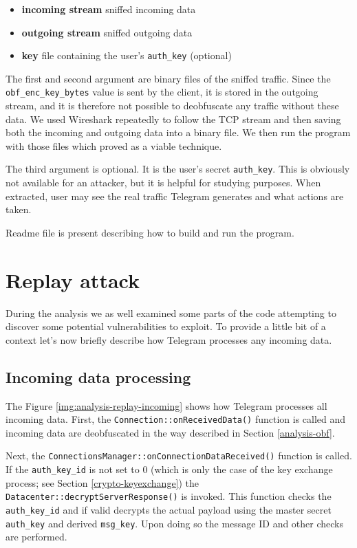 \documentclass[thesis=M,english]{FITthesis}[2012/10/20]
\begin{document}
\begin{itemize}

	\item \textbf{incoming stream} sniffed incoming data
	\item \textbf{outgoing stream} sniffed outgoing data
	\item \textbf{key} file containing the user's \texttt{auth\_key} (optional)

\end{itemize}

The first and second argument are binary files of the sniffed traffic. Since the \texttt{obf\_enc\_key\_bytes} value is sent by the client, it is stored in the outgoing stream, and it is therefore not possible to deobfuscate any traffic without these data. We used Wireshark repeatedly to follow the TCP stream and then saving both the incoming and outgoing data into a binary file. We then run the program with those files which proved as a viable technique.

The third argument is optional. It is the user's secret \texttt{auth\_key}. This is obviously not available for an attacker, but it is helpful for studying purposes. When extracted, user may see the real traffic Telegram generates and what actions are taken.

Readme file is present describing how to build and run the program.



\section{Replay attack}\label{analysis-attacks}

During the analysis we as well examined some parts of the code attempting to discover some potential vulnerabilities to exploit. To provide a little bit of a context let's now briefly describe how Telegram processes any incoming data.

\subsection{Incoming data processing}

The Figure \ref{img:analysis-replay-incoming} shows how Telegram processes all incoming data. First, the \texttt{Connection::onReceivedData()} function is called and incoming data are deobfuscated in the way described in Section \ref{analysis-obf}.

Next, the \texttt{ConnectionsManager::onConnectionDataReceived()} function is called. If the \texttt{auth\_key\_id} is not set to 0 (which is only the case of the key exchange process; see Section \ref{crypto-keyexchange}) the \texttt{Datacenter::decryptServerResponse()} is invoked. This function checks the \texttt{auth\_key\_id} and if valid decrypts the actual payload using the master secret \texttt{auth\_key} and derived \texttt{msg\_key}. Upon doing so the message ID and other checks are performed.
\end{document}
